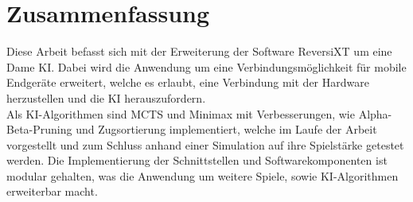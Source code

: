 \thispagestyle{empty}
\section*{Zusammenfassung}

\bigskip 


Diese Arbeit befasst sich mit der Erweiterung der Software ReversiXT um eine Dame \ac{KI}. 
Dabei wird die Anwendung um eine Verbindungsmöglichkeit für mobile Endgeräte erweitert, welche es erlaubt, eine Verbindung
mit der Hardware herzustellen und die \ac{KI} herauszufordern.
\\
Als \ac{KI}-Algorithmen sind \ac{MCTS} und Minimax mit Verbesserungen, wie Alpha-Beta-Pruning und Zugsortierung implementiert,
welche im Laufe der Arbeit vorgestellt und zum Schluss anhand einer Simulation auf ihre Spielstärke getestet werden.
Die Implementierung der Schnittstellen und Softwarekomponenten ist modular gehalten, was die Anwendung 
um weitere Spiele, sowie \ac{KI}-Algorithmen erweiterbar macht. 